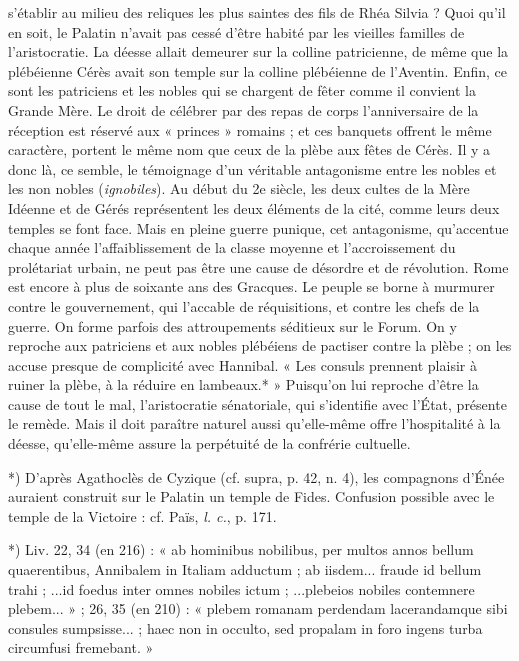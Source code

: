 \documentclass[a4paper, 11pt, oneside, polutonikogreek, french]{article}
\begin{document}
s'établir au milieu des reliques les plus saintes des fils de Rhéa Silvia ? Quoi qu'il en soit, le Palatin n'avait pas cessé d'être habité par les vieilles familles de l'aristocratie. La déesse allait demeurer sur la colline patricienne, de même que la plébéienne Cérès avait son temple sur la colline plébéienne de l'Aventin. Enfin, ce sont les patriciens et les nobles qui se chargent de fêter comme il convient la Grande Mère. Le droit de célébrer par des repas de corps l'anniversaire de la réception est réservé aux « princes » romains ; et ces banquets offrent le même caractère, portent le même nom que ceux de la plèbe aux fêtes de Cérès. Il y a donc là, ce semble, le témoignage d'un véritable antagonisme entre les nobles et les non nobles (\emph{ignobiles}). Au début du 2e siècle, les deux cultes de la Mère Idéenne et de Gérés représentent les deux éléments de la cité, comme leurs deux temples se font face. Mais en pleine guerre punique, cet antagonisme, qu'accentue chaque année l'affaiblissement de la classe moyenne et l'accroissement du prolétariat urbain, ne peut pas être une cause de désordre et de révolution. Rome est encore à plus de soixante ans des Gracques. Le peuple se borne à murmurer contre le gouvernement, qui l'accable de réquisitions, et contre les chefs de la guerre. On forme parfois des attroupements séditieux sur le Forum. On y reproche aux patriciens et aux nobles plébéiens de pactiser contre la plèbe ; on les accuse presque de complicité avec Hannibal. « Les consuls prennent plaisir à ruiner la plèbe, à la réduire en lambeaux.* » Puisqu'on lui reproche d'être la cause de tout le mal, l'aristocratie sénatoriale, qui s'identifie avec l'État, présente le remède. Mais il doit paraître naturel aussi qu'elle-même offre l'hospitalité à la déesse, qu'elle-même assure la perpétuité de la confrérie cultuelle.

*) D'après Agathoclès de Cyzique (cf. supra, p. 42, n. 4), les compagnons d'Énée auraient construit sur le Palatin un temple de Fides. Confusion possible avec le temple de la Victoire : cf. Païs, \emph{l. c.}, p. 171.

*) Liv. 22, 34 (en 216) : « ab hominibus nobilibus, per multos annos bellum quaerentibus, Annibalem in Italiam adductum ; ab iisdem... fraude id bellum trahi ; ...id foedus inter omnes nobiles ictum ; ...plebeios nobiles contemnere plebem... » ; 26, 35 (en 210) : « plebem romanam perdendam lacerandamque sibi consules sumpsisse... ; haec non in occulto, sed propalam in foro ingens turba circumfusi fremebant. »
\end{document}
